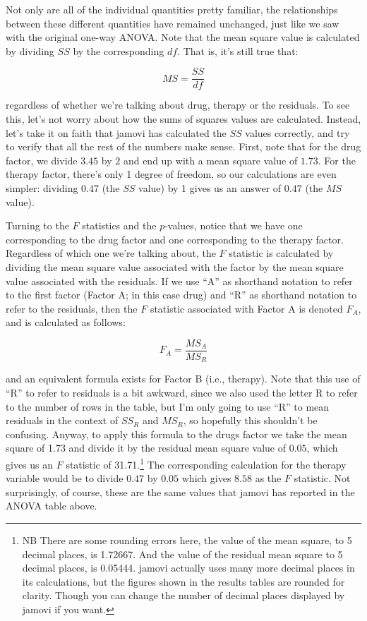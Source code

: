 \documentclass[
  a4paper,
]{book}
\begin{document}
Not only are all of the individual quantities pretty familiar, the
relationships between these different quantities have remained
unchanged, just like we saw with the original one-way ANOVA. Note that
the mean square value is calculated by dividing \(SS\) by the
corresponding \(df\). That is, it's still true that:

\[MS=\frac{SS}{df}\]

regardless of whether we're talking about drug, therapy or the
residuals. To see this, let's not worry about how the sums of squares
values are calculated. Instead, let's take it on faith that jamovi has
calculated the \(SS\) values correctly, and try to verify that all the
rest of the numbers make sense. First, note that for the drug factor, we
divide \(3.45\) by \(2\) and end up with a mean square value of
\(1.73\). For the therapy factor, there's only 1 degree of freedom, so
our calculations are even simpler: dividing \(0.47\) (the \(SS\) value)
by 1 gives us an answer of \(0.47\) (the \(MS\) value).

Turning to the \(F\) statistics and the \(p\)-values, notice that we
have one corresponding to the drug factor and one corresponding to the
therapy factor. Regardless of which one we're talking about, the \(F\)
statistic is calculated by dividing the mean square value associated
with the factor by the mean square value associated with the residuals.
If we use ``A'' as shorthand notation to refer to the first factor
(Factor A; in this case drug) and ``R'' as shorthand notation to refer
to the residuals, then the \(F\) statistic associated with Factor A is
denoted \(F_A\), and is calculated as follows:

\[F_A=\frac{MS_A}{MS_R}\]

and an equivalent formula exists for Factor B (i.e., therapy). Note that
this use of ``R'' to refer to residuals is a bit awkward, since we also
used the letter R to refer to the number of rows in the table, but I'm
only going to use ``R'' to mean residuals in the context of \({SS_R}\)
and \({MS_R}\), so hopefully this shouldn't be confusing. Anyway, to
apply this formula to the drugs factor we take the mean square of 1.73
and divide it by the residual mean square value of \(0.05\), which gives
us an \(F\) statistic of 31.71.\footnote{NB There are some rounding
  errors here, the value of the mean square, to 5 decimal places, is
  1.72667. And the value of the residual mean square to 5 decimal
  places, is 0.05444. jamovi actually uses many more decimal places in
  its calculations, but the figures shown in the results tables are
  rounded for clarity. Though you can change the number of decimal
  places displayed by jamovi if you want.} The corresponding calculation
for the therapy variable would be to divide \(0.47\) by \(0.05\) which
gives \(8.58\) as the \(F\) statistic. Not surprisingly, of course,
these are the same values that jamovi has reported in the ANOVA table
above.
\end{document}
